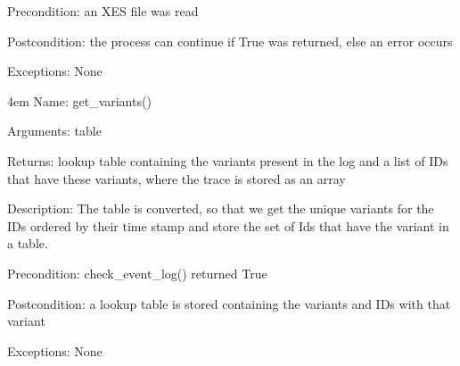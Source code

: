 \documentclass[notitlepage]{article}
\begin{document}
\begin{flushleft}
Precondition: an XES file was read 

Postcondition: the process can continue if True was returned, else an error occurs

Exceptions: None
\par
\endgroup








\par
\begingroup
\leftskip4em
Name: get_variants()

Arguments: table

Returns: lookup table containing the variants present in the log and a list of IDs that have these variants, where the trace is stored as an array

Description: The table is converted, so that we get the unique variants for the IDs ordered by their time stamp and store the set of Ids that have the variant in a table.

Precondition: check\_event\_log() returned True

Postcondition: a lookup table is stored containing the variants and IDs with that variant

Exceptions: None

\par
\endgroup







\end{flushleft}
\end{document}
